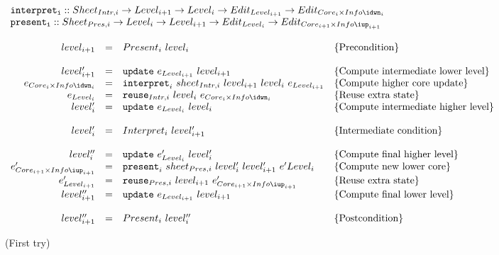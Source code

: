 \begin{small}\( \begin{array}{lcl}  \label{inv:incrementality}
{\tt interpret_i}  ::  Sheet_{Intr,i} \rightarrow Level_{i+1} \rightarrow Level_{i} \rightarrow  Edit_{Level_{i+1}} \rightarrow Edit_{Core_{i}\times Info\idwn_{i}} \\
{\tt present_i}  ::  Sheet_{Pres,i} \rightarrow Level_{i} \rightarrow Level_{i+1}  \rightarrow Edit_{Level_{i}} \rightarrow Edit_{Core_{i+1}\times Info\iup_{i+1}}\\
\\
\end{array}\) \\
\( \begin{array}{rcll}  
level_{i+1} 	& = & Present_{i}~level_{i}						& \text{\{Precondition\}}\\
\\
level'_{i+1} 	& = & {\tt update}~e_{Level_{i+1}}~level_{i+1}                 & \text{\{Compute intermediate lower level\}}\\
e_{Core_{i} \times Info\idwn_{i}}  & = & {\tt interpret}_{i}~sheet_{Intr,i}~level_{i+1}~level_{i}~e_{Level_{i+1}} & \text{\{Compute higher core update\}}\\
e_{Level_{i}} & = & {\tt reuse}_{Intr,i}~level_{i}~e_{Core_{i}\times Info\idwn_{i}}     & \text{\{Reuse extra state\}}\\
level'_{i} & = & {\tt update}~e_{Level_{i}}~level_{i}                 & \text{\{Compute intermediate higher level\}}\\
\\\
level'_{i} & = & Interpret_{i}~level'_{i+1}						& \text{\{Intermediate condition\}}\\
\\
level''_{i} & = & {\tt update}~e'_{Level_{i}}~level'_{i}                 & \text{\{Compute final higher level\}}\\
e'_{Core_{i+1}\times Info\iup_{i+1}}  & = & {\tt present}_{i}~sheet_{Pres,i}~level'_{i}~level'_{i+1}~e'{Level_{i}} & \text{\{Compute new lower core\}}\\
e'_{Level_{i+1}} & = & {\tt reuse}_{Pres,i}~level_{i+1}~e'_{Core_{i+1}\times Info\iup_{i+1}} & \text{\{Reuse extra state\}}\\
level''_{i+1} & = & {\tt update}~e_{Level_{i+1}}~level_{i+1}                 & \text{\{Compute final lower level\}}\\
\\
level''_{i+1} & = & Present_{i}~level''_{i}						& \text{\{Postcondition\}}\\
\end{array}\)
\end{small}
\begin{center}(First try)\end{center}\vspace{1em}



